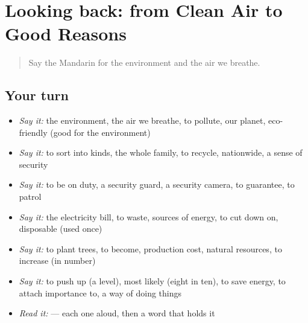 \section[(dialogue)]{Looking back: from Clean Air to Good Reasons}

\label{lesson:ZH-R385-review-380-385}



\begin{quote}
Say the Mandarin for the environment and the air we breathe.
\end{quote}

\subsection*{Your turn}
\begin{itemize}
\raggedright
  \item \emph{Say it:} the environment, the air we breathe, to pollute, our planet, eco-friendly (good for the environment)
  \item \emph{Say it:} to sort into kinds, the whole family, to recycle, nationwide, a sense of security
  \item \emph{Say it:} to be on duty, a security guard, a security camera, to guarantee, to patrol
  \item \emph{Say it:} the electricity bill, to waste, sources of energy, to cut down on, disposable (used once)
  \item \emph{Say it:} to plant trees, to become, production cost, natural resources, to increase (in number)
  \item \emph{Say it:} to push up (a level), most likely (eight in ten), to save energy, to attach importance to, a way of doing things
  \item \emph{Read it:}    — each one aloud, then a word that holds it
\end{itemize}

